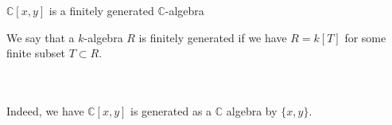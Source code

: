 \documentclass{beamer}
\newcommand{\C}{\mathbb{C}}
\begin{document}
\begin{frame}{$\C[x,y]$ is a finitely generated $\C$-algebra}
\begin{definition}
We say that a $k$-algebra $R$ is finitely generated if we have $R=k[T]$ for some finite subset $T\subset R$.
\end{definition}
\\~\\
Indeed, we have $\C[x,y]$ is generated as a $\C$ algebra by $\{x,y\}$.
\end{frame}
\end{document}
